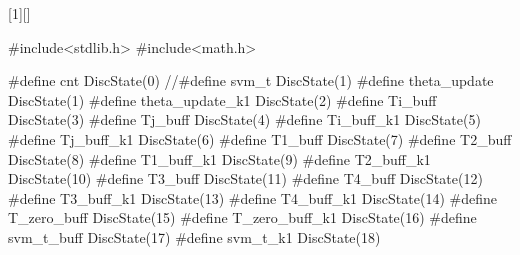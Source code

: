 
[1][]
    {\lstset{
        frame=single,
        numbersep=10pt,
        tabsize=2,
        #1
    }
}{}
\begin{mylisting}[language=c,caption=SRDBControlブロック:宣言文,label=SRDBcontrolD]
#include<stdlib.h>
#include<math.h>

#define cnt DiscState(0)
//#define svm_t DiscState(1)
#define theta_update DiscState(1)
#define theta_update_k1 DiscState(2)
#define Ti_buff DiscState(3)
#define Tj_buff DiscState(4)
#define Ti_buff_k1 DiscState(5)
#define Tj_buff_k1 DiscState(6)
#define T1_buff DiscState(7)
#define T2_buff DiscState(8)
#define T1_buff_k1 DiscState(9)
#define T2_buff_k1 DiscState(10)
#define T3_buff DiscState(11)
#define T4_buff DiscState(12)
#define T3_buff_k1 DiscState(13)
#define T4_buff_k1 DiscState(14)
#define T_zero_buff DiscState(15)
#define T_zero_buff_k1 DiscState(16)
#define svm_t_buff DiscState(17)
#define svm_t_k1 DiscState(18)
\end{mylisting}

